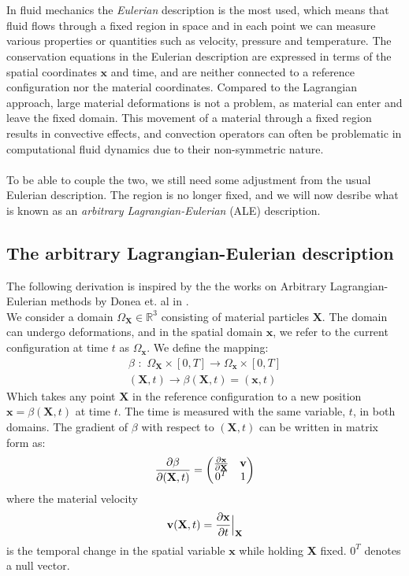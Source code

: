 \\
\\
In fluid mechanics the \textit{Eulerian} description is the most used, which means that fluid flows through a fixed region in space and in each point we can measure various properties or quantities such as velocity, pressure and temperature. The conservation equations in the Eulerian description are expressed in terms of the spatial coordinates $\mathbf{x}$ and time, and are neither connected to a reference configuration nor the material coordinates. Compared to the Lagrangian approach, large material deformations is not a problem, as material can enter and leave the fixed domain. This movement of a material through a fixed region results in convective effects, and convection operators can often be problematic in computational fluid dynamics due to their non-symmetric nature. 
\\
\\
To be able to couple the two, we still need some adjustment from the usual Eulerian description. The region is no longer fixed, and we will now desribe what is known as an \textit{arbitrary Lagrangian-Eulerian} (ALE) description.

\subsection{The arbitrary Lagrangian-Eulerian description}
The following derivation is inspired by the the works on Arbitrary Lagrangian-Eulerian methods by Donea et. al in \cite{Done04}. 
\\
We consider a domain $\Omega_{\mathbf{X}} \in \mathbb{R}^3$ consisting of material particles $\mathbf{X}$. The domain can undergo deformations, and in the spatial domain $\mathbf{x}$, we refer to the current configuration at time $t$ as $\Omega_\mathbf{x}$. We define the mapping:
\begin{align}
\beta \,\, : \,\, \Omega_{\mathbf{X}} \times [0,T] \rightarrow  \Omega_{\mathbf{x}} \times [0,T] \\
(\mathbf{X},t) \rightarrow \beta(\mathbf{X},t) = (\mathbf{x},t)
\end{align}
Which takes any point $\mathbf{X}$ in the reference configuration to a new position $\mathbf{x} = \beta(\mathbf{X},t)$ at time $t$. The time is measured with the same variable, $t$, in both domains. The gradient of $\beta$ with respect to $(\mathbf{X},t)$ can be written in matrix form as:
\begin{align}
\frac{\partial \beta}{\partial (\mathbf{X},t)} = \begin{pmatrix} \frac{\partial \mathbf{x}}{\partial \mathbf{X}} & \mathbf{v} \\
											0^T & 1
								\end{pmatrix}
\end{align}
where the material velocity
\begin{align} \mathbf{v}(\mathbf{X},t) = \frac{\partial \mathbf{x}}{\partial t}\Big{|}_{\mathbf{X}}
\end{align}
is the temporal change in the spatial variable $\mathbf{x}$ while holding \textbf{X} fixed. $0^T$ denotes a null vector. 






